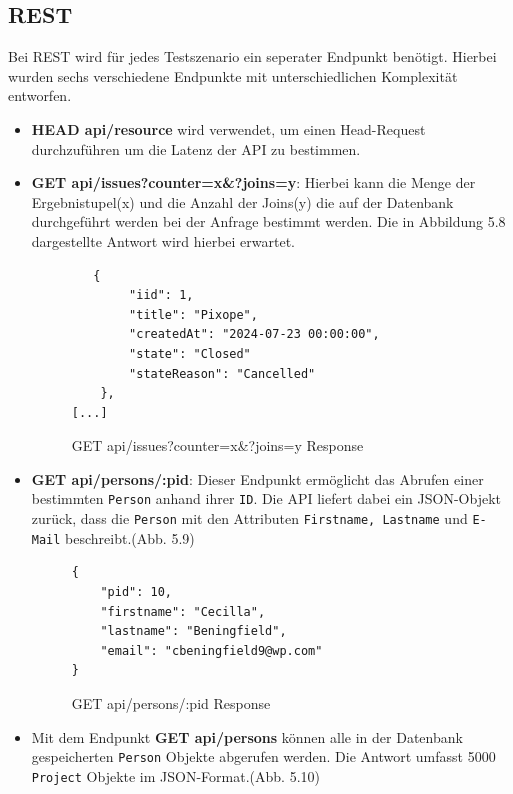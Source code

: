 \subsection{REST}
\label{sec:rest}
Bei REST wird für jedes Testszenario ein seperater Endpunkt benötigt. Hierbei wurden sechs verschiedene Endpunkte mit unterschiedlichen Komplexität entworfen.

\begin{itemize}
\item \colorbox{gray!20}{\textbf{HEAD api/resource}} wird verwendet, um einen Head-Request durchzuführen um die Latenz der API zu bestimmen.
\item \colorbox{gray!20}{\textbf{GET api/issues?counter=x\&?joins=y}}: Hierbei kann die Menge der Ergebnistupel(x) und die Anzahl der Joins(y) die auf der Datenbank durchgeführt werden bei der Anfrage bestimmt werden. Die in Abbildung 5.8 dargestellte Antwort wird hierbei erwartet.
\begin{figure}[H]
\begin{center}
\begin{BVerbatim}
   {
        "iid": 1,
        "title": "Pixope",
        "createdAt": "2024-07-23 00:00:00",
        "state": "Closed"
        "stateReason": "Cancelled"
    },
[...]
\end{BVerbatim}
\end{center}
\caption{GET api/issues?counter=x\&?joins=y Response}
\end{figure}


\item \colorbox{gray!20}{\textbf{GET api/persons/:pid}}: Dieser Endpunkt ermöglicht das Abrufen einer bestimmten \texttt{Person} anhand ihrer \texttt{ID}. Die API liefert dabei ein JSON-Objekt zurück, dass die \texttt{Person} mit den Attributen \texttt{Firstname, Lastname} und \texttt{E-Mail} beschreibt.(Abb. 5.9)
\begin{figure}[H]
\begin{center}
\begin{BVerbatim}
{
    "pid": 10,
    "firstname": "Cecilla",
    "lastname": "Beningfield",
    "email": "cbeningfield9@wp.com"
}
\end{BVerbatim}
\end{center}
\caption{GET api/persons/:pid Response}
\end{figure}

\item Mit dem Endpunkt  \colorbox{gray!20}{\textbf{GET api/persons}} können alle in der Datenbank gespeicherten \texttt{Person} Objekte abgerufen werden. Die Antwort umfasst 5000 \texttt{Project} Objekte im JSON-Format.(Abb. 5.10)


\end{itemize}
